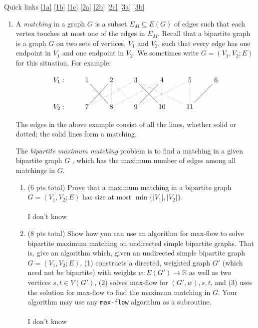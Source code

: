 \documentclass[12pt]{article}
\begin{document}
\renewcommand{\headrulewidth}{0.5pt}
\phantom{Test}

Quick links \ref{1a} \ref{1b} \ref{1c} \ref{2a} \ref{2b} \ref{2c} \ref{3a} \ref{3b}

\vspace{-3mm}
\begin{enumerate}

\item A \emph{matching} in a graph $G$ is a subset $E_M
    \subseteq E(G)$ of edges such that each vertex touches at most one of the
        edges in $E_M$. Recall that a bipartite graph is a graph $G$ on two
        sets of vertices, $V_1$ and $V_2$, such that every edge has one
        endpoint in $V_1$ and one endpoint in $V_2$. We sometimes write $G =
        (V_1, V_2; E)$ for this situation. For example:
	
	\[
\xymatrix{
V_1: & 1 \cir{}  \ar@{-}[dr] & 2 \ar@{-}[dl] \ar@{.}[d] \ar@{.}[dr] & 3 \ar@{.}[dll] \ar@{-}[dr]\ar@{.}[drr]  & 4 \ar@{.}[dll] \ar@{-}[dl] \ar@{.}[d] & 5 \ar@{.}[dll]  \ar@{.}[d]  & 6 \ar@{-}[dl] \\
V_2: & 7 & 8 & 9  & 10 & 11 
}
\]

The edges in the above example consist of all the lines, whether solid or dotted; the solid lines form a matching. 

The \emph{bipartite maximum matching} problem is to find a matching in a given bipartite graph $G$ , which has the maximum number of edges among all matchings in $G$.
\pagebreak

\begin{enumerate}
    \item (6 pts total)  \label{1a} Prove that a maximum matching in a bipartite graph $G = (V_1, V_2; E)$ has size at most $\min\{|V_1|, |V_2|\}$.
\\ \\ I don't know
\pagebreak

\item (8 pts total) \label{1b} Show how you can use an algorithm for max-flow to solve bipartite maximum
    matching on undirected simple bipartite graphs. That is, give an algorithm
        which, given an undirected simple bipartite graph $G = (V_1, V_2; E)$,
        (1) constructs a directed, weighted graph $G'$ (which need not be
        bipartite) with weights $w:E(G') \to \mathbb{R}$ as well as two
        vertices $s,t \in V(G')$, (2) solves max-flow for $(G', w),s,t$, and
        (3) uses the solution for max-flow to find the maximum matching in $G$.
        Your algorithm may use any \texttt{max-flow} algorithm as a subroutine.
\\ \\ I don't know
\pagebreak


\end{enumerate}
\end{enumerate}
\end{document}

